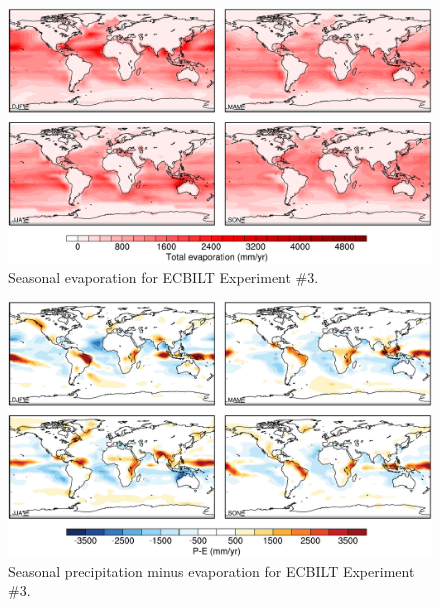 \documentclass[a4paper,11pt]{article}
\begin{document}
\begin{figure}
  \begin{center}
    \includegraphics[width=\textwidth]{../expt-3/plots/evap-plots}
  \end{center}
  \caption{Seasonal evaporation for ECBILT Experiment \#3.}
  \label{fig:evap-3}
\end{figure}

\begin{figure}
  \begin{center}
    \includegraphics[width=\textwidth]{../expt-3/plots/pmine-plots}
  \end{center}
  \caption{Seasonal precipitation minus evaporation for ECBILT
    Experiment \#3.}
  \label{fig:pmine-3}
\end{figure}
\end{document}
